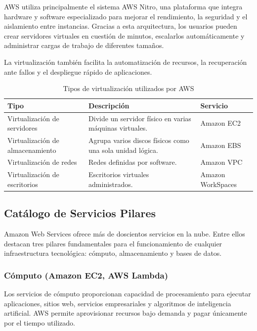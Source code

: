 \documentclass[12pt,a4paper]{article}
\begin{document}
AWS utiliza principalmente el sistema AWS Nitro, una plataforma que integra hardware y software especializado para mejorar el rendimiento, la seguridad y el aislamiento entre instancias. Gracias a esta arquitectura, los usuarios pueden crear servidores virtuales en cuestión de minutos, escalarlos automáticamente y administrar cargas de trabajo de diferentes tamaños\parencite{awsNitro}.

La virtualización también facilita la automatización de recursos, la recuperación ante fallos y el despliegue rápido de aplicaciones.

\begin{table}[H]
\centering
\caption{Tipos de virtualización utilizados por AWS}
\begin{tabularx}{\textwidth}{lXX}
\toprule
\textbf{Tipo} & \textbf{Descripción} & \textbf{Servicio}\\
\midrule
Virtualización de servidores & Divide un servidor físico en varias máquinas virtuales. & Amazon EC2\\

Virtualización de almacenamiento & Agrupa varios discos físicos como una sola unidad lógica. & Amazon EBS\\

Virtualización de redes & Redes definidas por software. & Amazon VPC\\

Virtualización de escritorios & Escritorios virtuales administrados. & Amazon WorkSpaces\\
\bottomrule
\end{tabularx}
\end{table}

\subsection{Catálogo de Servicios Pilares}

Amazon Web Services ofrece más de doscientos servicios en la nube. Entre ellos destacan tres pilares fundamentales para el funcionamiento de cualquier infraestructura tecnológica: cómputo, almacenamiento y bases de datos.

\subsubsection{Cómputo (Amazon EC2, AWS Lambda)}

Los servicios de cómputo proporcionan capacidad de procesamiento para ejecutar aplicaciones, sitios web, servicios empresariales y algoritmos de inteligencia artificial. AWS permite aprovisionar recursos bajo demanda y pagar únicamente por el tiempo utilizado\parencite{amazonEC2}.
\end{document}
